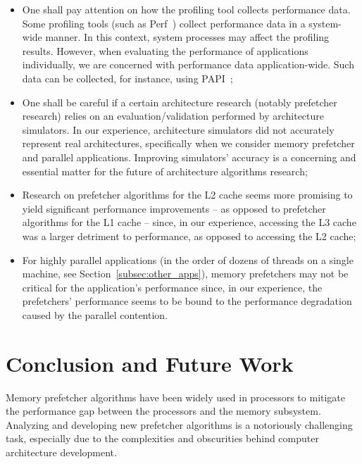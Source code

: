 \documentclass[AMA,final,STIX1COL]{WileyNJD-v2}
\begin{document}
\begin{itemize}
    \item One shall pay attention on how the profiling tool collects performance data. Some profiling tools (such as Perf~\cite{de2010new}) collect performance data in a system-wide manner. In this context, system processes may affect the profiling results. However, when evaluating the performance of applications individually, we are concerned with performance data application-wide. Such data can be collected, for instance, using PAPI~\cite{terpstra2010papi};
    
    \item One shall be careful if a certain architecture research (notably prefetcher research) relies on an evaluation/validation performed by architecture simulators. In our experience, architecture simulators did not accurately represent real architectures, specifically when we consider memory prefetcher and parallel applications. Improving simulators' accuracy is a concerning and essential matter for the future of architecture algorithms research;
    
    \item Research on prefetcher algorithms for the L2 cache seems more promising to yield significant performance improvements -- as opposed to prefetcher algorithms for the L1 cache -- since, in our experience, accessing the L3 cache was a larger detriment to performance, as opposed to accessing the L2 cache;
    
    \item For highly parallel applications (in the order of dozens of threads on a single machine, see Section~\ref{subsec:other_apps}), memory prefetchers may not be critical for the application's performance since, in our experience, the prefetchers' performance seems to be bound to the performance degradation caused by the parallel contention.
\end{itemize}




\section{Conclusion and Future Work}\label{sec:conclusion}

Memory prefetcher algorithms have been widely used in processors to mitigate the performance gap between the processors and the memory subsystem. Analyzing and developing new prefetcher algorithms is a notoriously challenging task, especially due to the complexities and obscurities behind computer architecture development.
\end{document}
